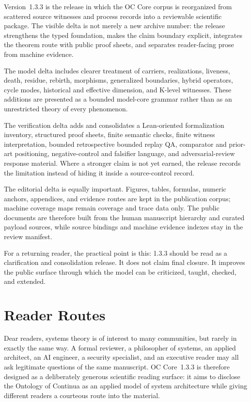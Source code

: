 Version~1.3.3 is the release in which the OC Core corpus is reorganized from
scattered source witnesses and process records into a reviewable scientific
package. The visible delta is not merely a new archive number: the release
strengthens the typed foundation, makes the claim boundary explicit, integrates
the theorem route with public proof sheets, and separates reader-facing prose
from machine evidence.

The model delta includes clearer treatment of carriers, realizations, liveness,
death, residue, rebirth, morphisms, generalized boundaries, hybrid operators,
cycle modes, historical and effective dimension, and K-level witnesses. These
additions are presented as a bounded model-core grammar rather than as an
unrestricted theory of every phenomenon.

The verification delta adds and consolidates a Lean-oriented formalization inventory, structured
proof sheets, finite semantic checks, finite witness interpretation, bounded
retrospective bounded replay QA, comparator and prior-art positioning, negative-control
and falsifier language, and adversarial-review response material. Where a
stronger claim is not yet earned, the release records the limitation instead of
hiding it inside a source-control record.

The editorial delta is equally important. Figures, tables, formulas, numeric
anchors, appendices, and evidence routes are kept in the publication corpus;
machine coverage maps remain coverage and trace data only. The public
documents are therefore built from the human manuscript hierarchy and curated
payload sources, while source bindings and machine evidence indexes stay in the
review manifest.

For a returning reader, the practical point is this: 1.3.3 should be read as a
clarification and consolidation release. It does not claim final closure. It
improves the public surface through which the model can be criticized, taught,
checked, and extended.

\clearpage
\section*{Reader Routes}
Dear readers, systems theory is of interest to many communities, but rarely in
exactly the same way. A formal reviewer, a philosopher of systems, an applied
architect, an AI engineer, a security specialist, and an executive reader may
all ask legitimate questions of the same manuscript. OC Core~1.3.3 is therefore
designed as a deliberately generous scientific reading surface: it aims to
disclose the Ontology of Continua as an applied model of system architecture
while giving different readers a courteous route into the material.

